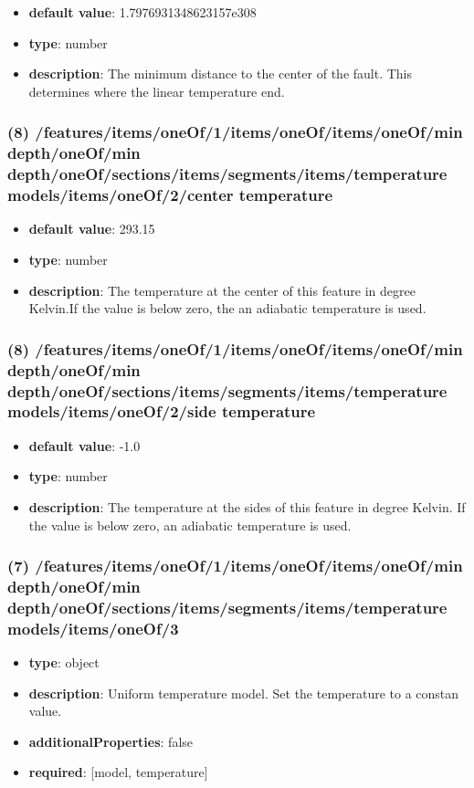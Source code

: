 \begin{itemize}[leftmargin=8em]\item {\bf default value}: 1.7976931348623157e308
\item {\bf type}: number
\item {\bf description}: The minimum distance to the center of the fault. This determines where the linear temperature end.
\end{itemize}\subsubsection{(8) /features/items/oneOf/1/items/oneOf/items/oneOf/min depth/oneOf/min depth/oneOf/sections/items/segments/items/temperature models/items/oneOf/2/center temperature}
\begin{itemize}[leftmargin=8em]\item {\bf default value}: 293.15
\item {\bf type}: number
\item {\bf description}: The temperature at the center of this feature in degree Kelvin.If the value is below zero, the an adiabatic temperature is used.
\end{itemize}\subsubsection{(8) /features/items/oneOf/1/items/oneOf/items/oneOf/min depth/oneOf/min depth/oneOf/sections/items/segments/items/temperature models/items/oneOf/2/side temperature}
\begin{itemize}[leftmargin=8em]\item {\bf default value}: -1.0
\item {\bf type}: number
\item {\bf description}: The temperature at the sides of this feature in degree Kelvin. If the value is below zero, an adiabatic temperature is used.
\end{itemize}\subsubsection{(7) /features/items/oneOf/1/items/oneOf/items/oneOf/min depth/oneOf/min depth/oneOf/sections/items/segments/items/temperature models/items/oneOf/3}
\begin{itemize}[leftmargin=7em]\item {\bf type}: object
\item {\bf description}: Uniform temperature model. Set the temperature to a constan value.
\item {\bf additionalProperties}: false
\item {\bf required}: [model, temperature]\end{itemize}
